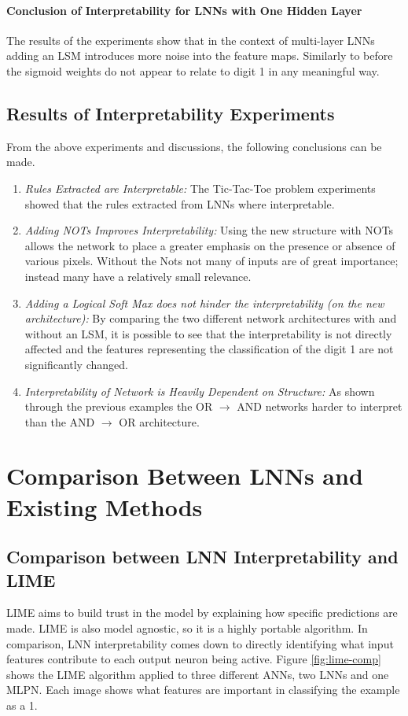 \paragraph{Conclusion of Interpretability for LNNs with One Hidden Layer}
	The results of the experiments show that in the context of multi-layer LNNs adding an LSM introduces more noise into the feature maps. Similarly to before the sigmoid weights do not appear to relate to digit 1 in any meaningful way.

\subsection{Results of Interpretability Experiments}
From the above experiments and discussions, the following conclusions can be made.

\begin{enumerate}
	\item \textit{Rules Extracted are Interpretable:} The Tic-Tac-Toe problem experiments showed that the rules extracted from LNNs where interpretable.
	\item \textit{Adding NOTs Improves Interpretability:} Using the new structure with NOTs allows the network to place a greater emphasis on the presence or absence of various pixels. Without the Nots not many of inputs are of great importance; instead many have a relatively small relevance.
	\item \textit{Adding a Logical Soft Max does not hinder the interpretability (on the new architecture):} By comparing the two different network architectures with and without an LSM, it is possible to see that the interpretability is not directly affected and the features representing the classification of the digit 1 are not significantly changed.
	\item \textit{Interpretability of Network is Heavily Dependent on Structure:} As shown through the previous examples the OR $\rightarrow$ AND networks harder to interpret than the AND $\rightarrow$ OR architecture.
\end{enumerate}

\section{Comparison Between LNNs and Existing Methods}
\subsection{Comparison between LNN Interpretability and LIME}
LIME aims to build trust in the model by explaining how specific predictions are made. LIME is also model agnostic, so it is a highly portable algorithm.  In comparison, LNN interpretability comes down to directly identifying what input features contribute to each output neuron being active. Figure \ref{fig:lime-comp} shows the LIME algorithm applied to three different ANNs, two LNNs and one MLPN. Each image shows what features are important in classifying the example as a 1.

